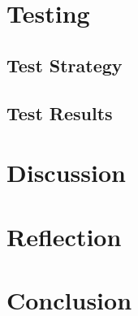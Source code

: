 \documentclass[a4paper,11pt]{article}
\begin{document}
\pagebreak
\section{Testing}


\subsection{Test Strategy}


\subsection{Test Results}


\pagebreak
\section{Discussion}


\pagebreak
\section{Reflection}


\pagebreak
\section{Conclusion}

\end{document}
